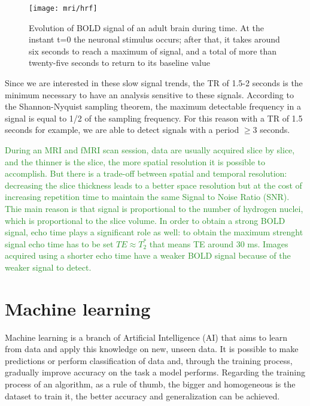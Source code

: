 \documentclass[11pt]{report}
\begin{document}
\begin{figure}[h]
\centering
\texttt{[image: mri/hrf]}
\caption{Evolution of BOLD signal of an adult brain during time. At the instant t=0 the neuronal stimulus occurs; after that, it takes around six seconds to reach a maximum of signal, and a total of more than twenty-five seconds to return to its baseline value}
\label{fig:hrf}
\end{figure}


Since we are interested in these slow signal trends, the TR of 1.5-2 seconds is the minimum necessary to have an analysis sensitive to these signals.
According to the Shannon-Nyquist sampling theorem, the maximum detectable frequency in a signal is equal to 1/2 of the sampling frequency.
For this reason with a TR of 1.5 seconds for example, we are able to detect signals with a period $\geq 3$ seconds.

\textcolor{ForestGreen}{During an MRI and fMRI scan session, data are usually acquired slice by slice, and the thinner is the slice, the more spatial resolution it is possible to accomplish.
But there is a trade-off between spatial and temporal resolution: decreasing the slice thickness leads to a better space resolution but at the cost of increasing repetition time to maintain the same Signal to Noise Ratio (SNR).
Thie main reason is that signal is proportional to the number of hydrogen nuclei, which is proportional to the slice volume.
In order to obtain a strong BOLD signal, echo time plays a significant role as well: to obtain the maximum strenght signal echo time has to be set $TE \approx T_2^{\ast}$ that means TE around 30 ms.
Images acquired using a shorter echo time have a weaker BOLD signal because of the weaker signal to detect. \cite{jenkinson2018}
}


\chapter{Machine learning}\label{chap:machine_learning}

Machine learning is a branch of Artificial Intelligence (AI) that aims to learn from data and apply this knowledge on new, unseen data.
It is possible to make predictions or perform classification of data and, through the training process, gradually improve accuracy on the task a model performs.
Regarding the training process of an algorithm, as a rule of thumb, the bigger and homogeneous is the dataset to train it, the better accuracy and generalization can be achieved. %
\end{document}
